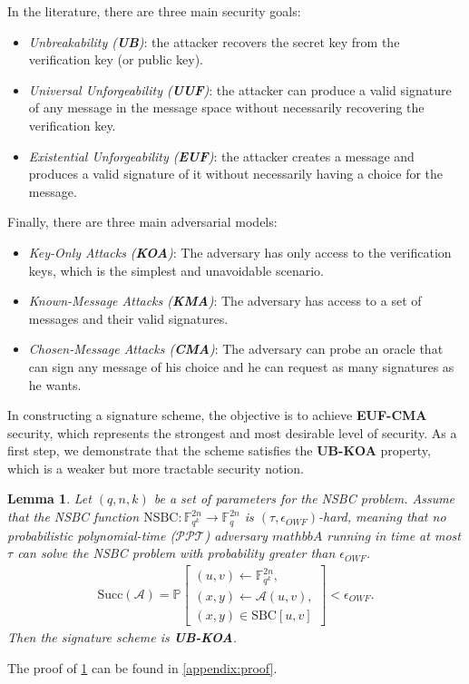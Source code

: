 \documentclass[english]{article}
\newtheorem{lemma}{Lemma}[section]
\begin{document}
		In the literature, there are three main security goals:
		\begin{itemize}
			\item \textit{Unbreakability (\textbf{UB})}: the attacker recovers the secret key from the verification key (or public key).
			\item \textit{Universal Unforgeability (\textbf{UUF})}: the attacker can produce a valid signature of any message in the message space without necessarily recovering the verification key.
			\item \textit{Existential Unforgeability (\textbf{EUF})}: the attacker creates a message and produces a valid signature of it without necessarily having a choice for the message.
		\end{itemize}
		Finally, there are three main adversarial models:
		\begin{itemize}
			\item \textit{Key-Only Attacks (\textbf{KOA})}: The adversary has only access to the verification keys, which is the simplest and unavoidable scenario.
			\item \textit{Known-Message Attacks (\textbf{KMA})}: The adversary has access to a set of messages and their valid signatures. 
			\item \textit{Chosen-Message Attacks (\textbf{CMA})}: The adversary can probe an oracle that can sign any message of his choice and he can request as many signatures as he wants.
		\end{itemize}

		In constructing a signature scheme, the objective is to achieve \textbf{EUF-CMA} security, which represents the strongest and most desirable level of security. As a first step, we demonstrate that the scheme satisfies the \textbf{UB-KOA} property, which is a weaker but more tractable security notion.
		
		\begin{lemma}\label{UB-KOA}
			Let $(q,n,k)$ be a set of parameters for the NSBC problem. Assume that the NSBC function $\text{NSBC} :\mathbb{F}_{q^k}^{2n} \rightarrow \mathbb{F}_{q}^{2n}$ is $(\tau, \epsilon_{OWF})$-hard, meaning that no probabilistic polynomial-time ($\mathcal{PPT}$) adversary $mathbb{A}$ running in time at most $\tau$ can solve the NSBC problem with probability greater than $\epsilon_{OWF}$.
			\begin{align*}
				\text{Succ}(\mathcal{A}) = \mathbb{P}\left[
				\begin{array}{l}
					(u, v) \leftarrow \mathbb{F}_{q^k}^{2n}, \\
					(x, y) \leftarrow \mathcal{A}(u, v), \\
					(x, y) \in \text{SBC}[u, v]
				\end{array}
				\right] < \epsilon_{OWF}.
			\end{align*}
			Then the signature scheme is \textbf{UB-KOA}.
		\end{lemma}
		The proof of \ref{UB-KOA} can be found in \ref{appendix:proof}.
		
\end{document}
